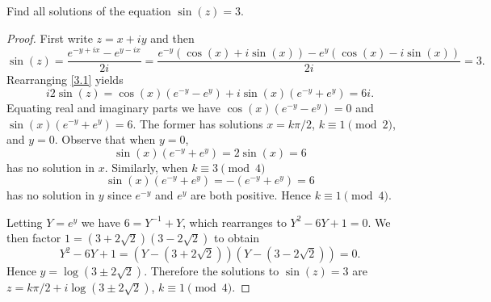 \documentclass[12pt]{amsart}
\begin{document}
\begin{thm}
  Find all solutions of the equation $\sin(z) = 3$.
  \begin{proof}
    First write $z = x + iy$ and then
    \begin{equation}\label{3.1}
      \sin(z) = \frac{e^{-y + ix} - e^{y - ix}}{2i} = \frac{e^{-y}(\cos(x) + i\sin(x)) - e^y(\cos(x) - i\sin(x))}{2i} = 3.
    \end{equation}
    Rearranging \eqref{3.1} yields
    $$i2\sin(z) = \cos(x)(e^{-y} - e^{y}) + i\sin(x)(e^{-y} + e^y) = 6i.$$
    Equating real and imaginary parts we have $\cos(x)(e^{-y} - e^{y}) = 0$ and $\sin(x)(e^{-y} + e^y) = 6$.
    The former has solutions $x = k\pi/2$, $k \equiv 1 \pmod{2}$, and $y = 0$.
    Observe that when $y = 0$, $$\sin(x)(e^{-y} + e^y) = 2\sin(x) = 6$$ has no solution in $x$.
	Similarly, when $k \equiv 3 \pmod{4}$
	$$\sin(x)(e^{-y} + e^y ) = -(e^{-y} + e^y) = 6$$ 
	has no solution in $y$ since $e^{-y}$ and $e^y$ are both positive.
    Hence $k \equiv 1 \pmod{4}$.
    
	Letting $Y = e^y$ we have $6 = Y^{-1} + Y$, which rearranges to $Y^2 - 6Y + 1 = 0$.
    We then factor $1 = (3 + 2\sqrt{2})(3 - 2\sqrt{2})$ to obtain $$Y^2 - 6Y + 1 = (Y - (3 + 2\sqrt{2}))(Y - (3 - 2\sqrt{2})) = 0.$$
    Hence $y = \log(3 \pm 2 \sqrt{2})$.
    Therefore the solutions to $\sin(z) = 3$ are $z = k\pi/2 + i \log(3 \pm 2\sqrt{2})$, $k \equiv 1 \pmod{4}$.
  \end{proof}
\end{thm}
\end{document}

